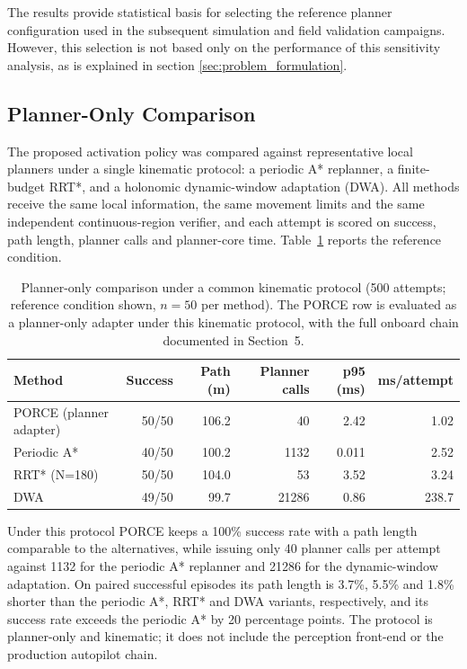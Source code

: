 \documentclass[electronics,article,submit,moreauthors]{Definitions/mdpi}
\DeclareRobustCommand{\added}[1]{#1}%
\DeclareRobustCommand{\added}[1]{\textcolor{green!50!black}{#1}}
\def\added#1{#1}%
\begin{document}
\added{The results provide statistical basis for selecting the reference planner configuration used in the subsequent simulation and field validation campaigns. However, this selection is not based only on the performance of this sensitivity analysis, as is explained in section \ref{sec:problem_formulation}.}


\subsection{Planner-Only Comparison}

\added{The proposed activation policy was compared against representative local planners under a single kinematic protocol: a periodic A* replanner, a finite-budget RRT*, and a holonomic dynamic-window adaptation (DWA). All methods receive the same local information, the same movement limits and the same independent continuous-region verifier, and each attempt is scored on success, path length, planner calls and planner-core time. Table~\ref{tab:pilot_montecarlo} reports the reference condition.}

\begin{table}[h!]
\centering
\caption{\added{Planner-only comparison under a common kinematic protocol (500 attempts; reference condition shown, $n=50$ per method). The PORCE row is evaluated as a planner-only adapter under this kinematic protocol, with the full onboard chain documented in Section~5.}}
\label{tab:pilot_montecarlo}
\small
\begin{tabular}{lrrrrr}
\toprule
\textbf{Method} & \textbf{Success} & \textbf{Path (m)} & \textbf{Planner calls} & \textbf{p95 (ms)} & \textbf{ms/attempt} \\
\midrule
\added{PORCE (planner adapter)} & \added{50/50} & \added{106.2} & \added{40} & \added{2.42} & \added{1.02} \\
\added{Periodic A*} & \added{40/50} & \added{100.2} & \added{1132} & \added{0.011} & \added{2.52} \\
\added{RRT* (N=180)} & \added{50/50} & \added{104.0} & \added{53} & \added{3.52} & \added{3.24} \\
\added{DWA} & \added{49/50} & \added{99.7} & \added{21286} & \added{0.86} & \added{238.7} \\
\bottomrule
\end{tabular}
\end{table}

\added{Under this protocol PORCE keeps a 100\% success rate with a path length comparable to the alternatives, while issuing only 40 planner calls per attempt against 1132 for the periodic A* replanner and 21286 for the dynamic-window adaptation. On paired successful episodes its path length is 3.7\%, 5.5\% and 1.8\% shorter than the periodic A*, RRT* and DWA variants, respectively, and its success rate exceeds the periodic A* by 20 percentage points. The protocol is planner-only and kinematic; it does not include the perception front-end or the production autopilot chain.}
\end{document}
